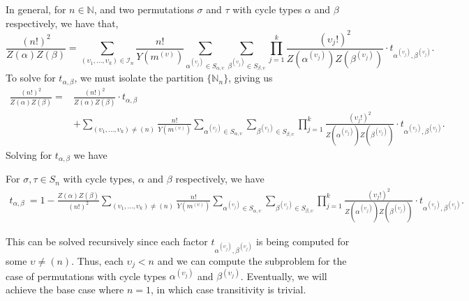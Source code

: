 In general, for $n\in\mathbb{N}$, and two permutations $\sigma$
and $\tau$ with cycle types $\alpha$ and $\beta$ respectively, we have that,
\[
  \frac{(n!)^2}{Z(\alpha)Z(\beta)} =
  \sum_{(\upsilon_1,\dots,\upsilon_k)\in\mathcal{I}_n}\frac{n!}{Y(m^{(\upsilon)})}\sum_{\alpha^{(\upsilon_j)}\in
  S_{\alpha,\upsilon}}\sum_{\beta^{(\upsilon_j)}\in
  S_{\beta,\upsilon}}\prod_{j=1}^k
  {\frac{(\upsilon_j!)^2}{Z(\alpha^{(\upsilon_j)})Z(\beta^{(\upsilon_j)})}}\cdot
  t_{\alpha^{(\upsilon_j)},\beta^{(\upsilon_j)}}.
\]
To solve for $t_{\alpha,\beta}$, we must isolate the partition
$\{\mathbb{N}_n\}$, giving us
\begin{align*}
  \frac{(n!)^2}{Z(\alpha)Z(\beta)} =
  &\frac{(n!)^2}{Z(\alpha)Z(\beta)}\cdot t_{\alpha, \beta}\\
  &+
  \sum_{(\upsilon_1,\dots,\upsilon_k)\ne(n)}\frac{n!}{Y(m^{(\upsilon)})}\sum_{\alpha^{(\upsilon_j)}\in
  S_{\alpha,\upsilon}}\sum_{\beta^{(\upsilon_j)}\in
  S_{\beta,\upsilon}}\prod_{j=1}^k
  {\frac{(\upsilon_j!)^2}{Z(\alpha^{(\upsilon_j)})Z(\beta^{(\upsilon_j)})}}\cdot
  t_{\alpha^{(\upsilon_j)},\beta^{(\upsilon_j)}}.
\end{align*}
Solving for $t_{\alpha,\beta}$ we have
\begin{theorem}
  For $\sigma,\tau\in S_n$ with cycle types, $\alpha$ and $\beta$
  respectively, we have
  \begin{align*}
    t_{\alpha, \beta}\ = 1 -
    \frac{Z(\alpha)Z(\beta)}{(n!)^2}\sum_{(\upsilon_1,\dots,\upsilon_k)\ne(n)}\frac{n!}{Y(m^{(\upsilon)})}\sum_{\alpha^{(\upsilon_j)}\in
    S_{\alpha,\upsilon}}\sum_{\beta^{(\upsilon_j)}\in
    S_{\beta,\upsilon}}\prod_{j=1}^k
    {\frac{(\upsilon_j!)^2}{Z(\alpha^{(\upsilon_j)})Z(\beta^{(\upsilon_j)})}}\cdot
    t_{\alpha^{(\upsilon_j)},\beta^{(\upsilon_j)}}.
  \end{align*}
\end{theorem}
\noindent This can be solved recursively since each factor
$t_{\alpha^{(\upsilon_j)},\beta^{(\upsilon_j)}}$ is being computed for
some $\upsilon \ne (n)$. Thus, each $\upsilon_j < n$ and we can
compute the subproblem for the case of permutations with cycle types
$\alpha^{(\upsilon_j)}$ and $\beta^{(\upsilon_j)}$. Eventually, we will
achieve the base case where $n = 1$, in which case transitivity is trivial.

